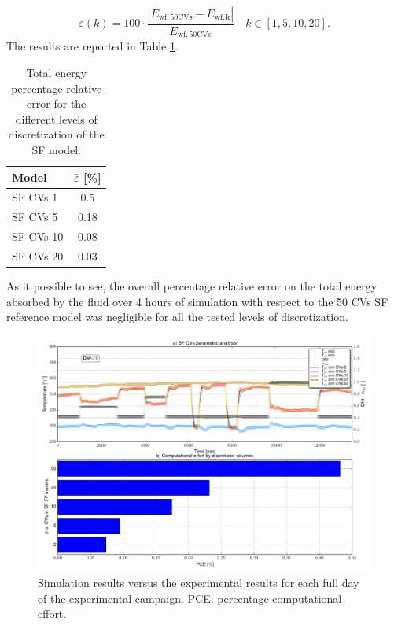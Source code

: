 \documentclass[final,3p,times,review]{elsarticle}
\begin{document}
%
\begin{equation}
\bar{\varepsilon}(k) = 100 \cdot \frac{|E_\mathrm{wf,50CVs} -E_\mathrm{wf,k}|}{E_\mathrm{wf,50CVs}}  \quad k \in [1,5,10,20]. 
\end{equation}
%
The results are reported in Table \ref{tab:SF_Etot}.
%
\begin{table}[h!]
  \centering
  \caption{Total energy percentage relative error for the different levels of discretization of the SF model.}
    \begin{tabular}{lc}
    \toprule
    Model & \multicolumn{1}{c}{$\bar{\varepsilon}$ [\%]}  \\
    \midrule
    SF CVs 1      & 0.5         \\
    SF CVs 5      & 0.18         \\
    SF CVs 10     & 0.08          \\
    SF CVs 20     & 0.03          \\   
    \bottomrule
    \end{tabular}%
  \label{tab:SF_Etot}%
\end{table}%
%
As it possible to see, the overall percentage relative error on the total energy absorbed by the fluid over 4 hours of simulation with respect to the 50 CVs SF reference model was negligible for all the tested levels of discretization.\\

\begin{landscape}
\begin{figure}[h!]
\centering
\includegraphics[height=0.95\textheight]{Figures/_SF_NodesParaALL.pdf}
\caption{Simulation results versus the experimental results for each full day of the experimental campaign. PCE: percentage computational effort.}
\label{fig:SF_ModRes_ParAnalysis}
\end{figure}
\end{landscape}
%
%
%
\end{document}
